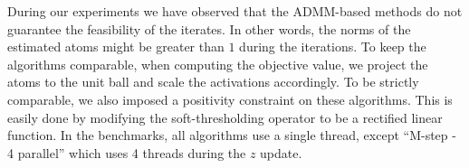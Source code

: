 


During our experiments we have observed that the ADMM-based methods do not guarantee the feasibility of the iterates. In other words, the norms of the estimated atoms might be greater than $1$ during the iterations. To keep the algorithms comparable, when computing the objective value, we project the atoms to the unit ball and scale the activations accordingly. To be strictly comparable, we also imposed a positivity constraint on these algorithms. This is easily done by modifying the soft-thresholding operator to be a rectified linear function. In the benchmarks, all algorithms use a single thread, except ``M-step - 4 parallel'' which uses 4 threads during the $z$ update.

